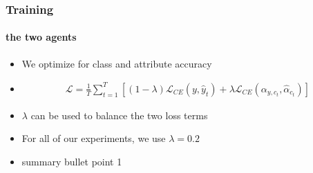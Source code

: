 \documentclass[9pt]{beamer}
\begin{document}
\begin{frame}
\frametitle{Training}
\framesubtitle{the two agents}
\begin{itemize}
	\item We optimize for class and attribute accuracy
	\item \begin{align*}
	\mathcal{L} = \frac{1}{T}\sum_{t=1}^{T}\left[(1-\lambda)\mathcal{L}_{CE}(y,\hat{y}_t) + \lambda \mathcal{L}_{CE}(\alpha_{y,c_t},\hat{\alpha}_{c_t}) \right]
	\end{align*}
	\item $\lambda$ can be used to balance the two loss terms
	\item For all of our experiments, we use $\lambda=0.2$
\end{itemize}
\end{frame}



\begin{frame}[plain]
\begin{itemize}
	\item summary bullet point 1
\end{itemize}
\end{frame}
\end{document}
